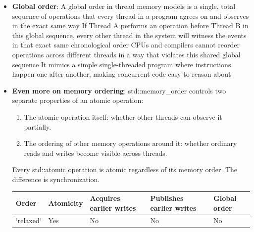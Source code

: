 \documentclass{report}
\begin{document}
\begin{itemize}
            \begin{itemize}
                \item \textbf{Sequenced-before:} ordering inside one thread.
                \item \textbf{Synchronizes-with:} ordering established between threads through synchronization operations.
                \item \textbf{Happens-before:} the combined ordering that makes earlier effects visible and prevents data races.
            \end{itemize}
        \item \textbf{Global order}: A global order in thread memory models is a single, total sequence of operations that every thread in a program agrees on and observes in the exact same way
            \bigbreak \noindent 
             If Thread A performs an operation before Thread B in this global sequence, every other thread in the system will witness the events in that exact same chronological order
             \bigbreak \noindent 
             CPUs and compilers cannot reorder operations across different threads in a way that violates this shared global sequence
             \bigbreak \noindent 
             It mimics a simple single-threaded program where instructions happen one after another, making concurrent code easy to reason about
        \item \textbf{Even more on memory ordering}: std::memory\_order controls two separate properties of an atomic operation:
            \begin{enumerate}
                \item The atomic operation itself: whether other threads can observe it partially.
                \item The ordering of other memory operations around it: whether ordinary reads and writes become visible across threads.
            \end{enumerate}
            Every std::atomic operation is atomic regardless of its memory order. The difference is synchronization.
            \begin{center}
                \begin{tabularx}{\textwidth}{@{}XXXXX@{}}
                    \toprule
                    \textbf{Order} & \textbf{Atomicity} & \textbf{Acquires earlier writes} & \textbf{Publishes earlier writes} & \textbf{Global order} \\ 
                    \midrule
                    `relaxed` & Yes & No & No & No \\ [2ex]

\end{tabularx}
\end{center}
\end{itemize}
\end{document}
